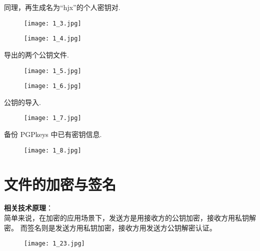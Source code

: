 \documentclass[../main.tex]{subfiles}
\begin{document}
同理，再生成名为``hjx''的个人密钥对.
\begin{figure}[H]
  \begin{center}
    \texttt{[image: 1\_3.jpg]}
  \end{center}
\end{figure}
\begin{figure}[H]
  \begin{center}
    \texttt{[image: 1\_4.jpg]}
  \end{center}
\end{figure}

导出的两个公钥文件.
\begin{figure}[H]
  \begin{center}
    \texttt{[image: 1\_5.jpg]}
  \end{center}
\end{figure}
\begin{figure}[H]
  \begin{center}
    \texttt{[image: 1\_6.jpg]}
  \end{center}
\end{figure}

公钥的导入.
\begin{figure}[H]
  \begin{center}
    \texttt{[image: 1\_7.jpg]}
  \end{center}
\end{figure}

备份 PGPkeys 中已有密钥信息.
\begin{figure}[H]
  \begin{center}
    \texttt{[image: 1\_8.jpg]}
  \end{center}
\end{figure}
%
\section{文件的加密与签名}
\textbf{相关技术原理}： \\
简单来说，在加密的应用场景下，发送方是用接收方的公钥加密，接收方用私钥解密。
而签名则是发送方用私钥加密，接收方用发送方公钥解密认证。

\begin{figure}[H]
  \begin{center}
    \texttt{[image: 1\_23.jpg]}
  \end{center}
\end{figure}
\end{document}

